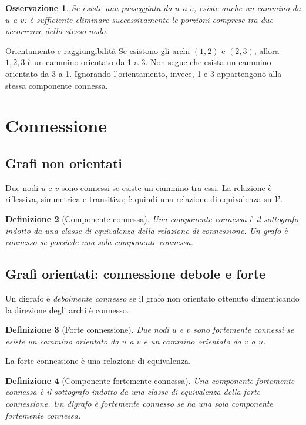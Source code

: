 \documentclass[11pt,a4paper]{article}
\newtheorem{definition}{Definizione}[section]
\newtheorem{observation}[definition]{Osservazione}
\newcommand{\V}{\mathcal{V}}
\begin{document}
\begin{observation}
Se esiste una passeggiata da $u$ a $v$, esiste anche un cammino da $u$ a $v$: è sufficiente eliminare successivamente le porzioni comprese tra due occorrenze dello stesso nodo.
\end{observation}

\begin{examplebox}{Orientamento e raggiungibilità}
Se esistono gli archi $(1,2)$ e $(2,3)$, allora $1,2,3$ è un cammino orientato da 1 a 3. Non segue che esista un cammino orientato da 3 a 1. Ignorando l'orientamento, invece, 1 e 3 appartengono alla stessa componente connessa.
\end{examplebox}

\section{Connessione}

\subsection{Grafi non orientati}

Due nodi $u$ e $v$ sono connessi se esiste un cammino tra essi. La relazione è riflessiva, simmetrica e transitiva; è quindi una relazione di equivalenza su $\V$.

\begin{definition}[Componente connessa]
Una componente connessa è il sottografo indotto da una classe di equivalenza della relazione di connessione. Un grafo è connesso se possiede una sola componente connessa.
\end{definition}

\subsection{Grafi orientati: connessione debole e forte}

Un digrafo è \emph{debolmente connesso} se il grafo non orientato ottenuto dimenticando la direzione degli archi è connesso.

\begin{definition}[Forte connessione]
Due nodi $u$ e $v$ sono fortemente connessi se esiste un cammino orientato da $u$ a $v$ e un cammino orientato da $v$ a $u$.
\end{definition}

La forte connessione è una relazione di equivalenza.

\begin{definition}[Componente fortemente connessa]
Una componente fortemente connessa è il sottografo indotto da una classe di equivalenza della forte connessione. Un digrafo è fortemente connesso se ha una sola componente fortemente connessa.
\end{definition}
\end{document}
